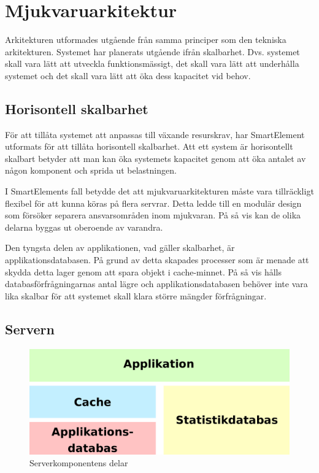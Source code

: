 \section{Mjukvaruarkitektur}

Arkitekturen utformades utgående från samma principer som den tekniska arkitekturen. Systemet har planerats utgående ifrån skalbarhet. Dvs. systemet skall vara lätt att utveckla funktionsmässigt, det skall vara lätt att underhålla systemet och det skall vara lätt att öka dess kapacitet vid behov. \citep[s. 203]{scalableweb}

\subsection{Horisontell skalbarhet}

För att tillåta systemet att anpassas till växande resurskrav, har SmartElement utformats för att tillåta horisontell skalbarhet. Att ett system är horisontellt skalbart betyder att man kan öka systemets kapacitet genom att öka antalet av någon komponent och sprida ut belastningen. \citep[s. 205-207]{scalableweb}

I SmartElements fall betydde det att mjukvaruarkitekturen måste vara tillräckligt flexibel för att kunna köras på flera servrar. Detta ledde till en modulär design som försöker separera ansvarsområden inom mjukvaran. På så vis kan de olika delarna byggas ut oberoende av varandra.

Den tyngsta delen av applikationen, vad gäller skalbarhet, är applikationsdatabasen. På grund av detta skapades processer som är menade att skydda detta lager genom att spara objekt i cache-minnet. På så vis hålls databasförfrågningarnas antal lägre och applikationsdatabasen behöver inte vara lika skalbar för att systemet skall klara större mängder förfrågningar.

\subsection{Servern}

\begin{figure}[h!]
\centering
\includegraphics[width=120mm]{assets/images/smelementbackendparts.png}
\caption{Serverkomponentens delar}
\label{abstractbackend}
\end{figure}

